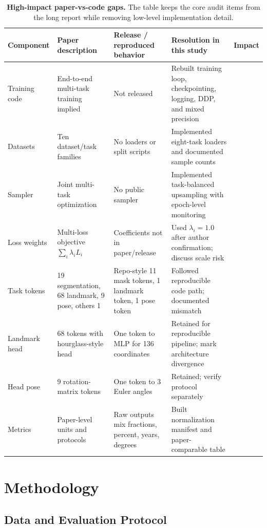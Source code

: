 \begin{table}[!t]
\caption{\textbf{High-impact paper-vs-code gaps.} The table keeps the core audit items from the long report while removing low-level implementation detail.}
\label{tab:gaps}
\centering
\scriptsize
\setlength{\tabcolsep}{3pt}
\begin{tabularx}{\textwidth}{p{}YYYp{0.09\textwidth}}
\toprule
Component & Paper description & Release / reproduced behavior & Resolution in this study & Impact \\
\midrule
Training code & End-to-end multi-task training implied & Not released & Rebuilt training loop, checkpointing, logging, DDP, and mixed precision &  \\
Datasets & Ten dataset/task families & No loaders or split scripts & Implemented eight-task loaders and documented sample counts &  \\
Sampler & Joint multi-task optimization & No public sampler & Implemented task-balanced upsampling with epoch-level monitoring &  \\
Loss weights & Multi-loss objective $\sum_i \lambda_i L_i$ & Coefficients not in paper/release & Used $\lambda_i=1.0$ after author confirmation; discuss scale risk &  \\
Task tokens & 19 segmentation, 68 landmark, 9 pose, others 1 & Repo-style 11 mask tokens, 1 landmark token, 1 pose token & Followed reproducible code path; documented mismatch &  \\
Landmark head & 68 tokens with hourglass-style head & One token to MLP for 136 coordinates & Retained for reproducible pipeline; mark architecture divergence &  \\
Head pose & 9 rotation-matrix tokens & One token to 3 Euler angles & Retained; verify protocol separately &  \\
Metrics & Paper-level units and protocols & Raw outputs mix fractions, percent, years, degrees & Built normalization manifest and paper-comparable table &  \\
\bottomrule
\end{tabularx}
\end{table}

\section{Methodology}

\subsection{Data and Evaluation Protocol}

